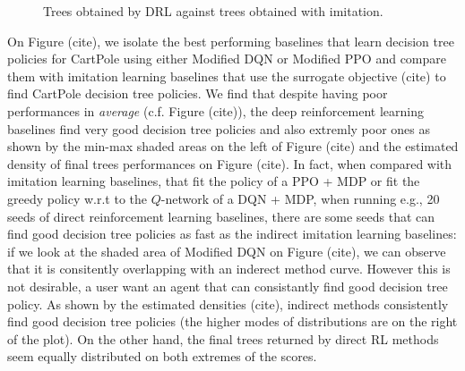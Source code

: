 \begin{figure}[htbp]
    \caption{Trees obtained by DRL against trees obtained with imitation.}
    \label{fig:trees-drl}
\end{figure}


On Figure (cite), we isolate the best performing baselines that learn decision tree policies for CartPole using either Modified DQN or Modified PPO and compare them with imitation learning baselines that use the surrogate objective (cite) to find CartPole decision tree policies.
We find that despite having poor performances in \textit{average} (c.f. Figure (cite)), the deep reinforcement learning baselines find very good decision tree policies and also extremly poor ones as shown by the min-max shaded areas on the left of Figure (cite) and the estimated density of final trees performances on Figure (cite).
In fact, when compared with imitation learning baselines, that fit the policy of a PPO + MDP or fit the greedy policy w.r.t to the $Q$-network of a DQN + MDP, when running e.g., 20 seeds of direct reinforcement learning baselines, there are some seeds that can find good decision tree policies as fast as the indirect imitation learning baselines: if we look at the shaded area of Modified DQN on Figure (cite), we can observe that it is consitently overlapping with an inderect method curve.
However this is not desirable, a user want an agent that can consistantly find good decision tree policy.
As shown by the estimated densities (cite), indirect methods consistently find good decision tree policies (the higher modes of distributions are on the right of the plot). On the other hand, the final trees returned by direct RL methods seem equally distributed on both extremes of the scores.

